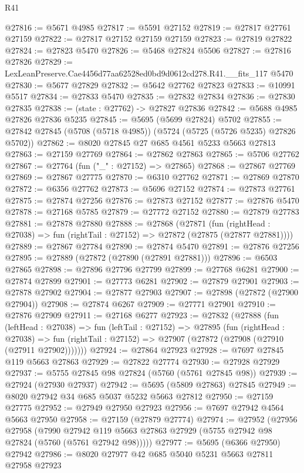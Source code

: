 \begin{lexlean}{R41}
\begin{coremodule}
@27816 := @5671 @4985
@27817 := @5591 @27152
@27819 := @27817 @27761 @27159
@27822 := @27817 @27152 @27159 @27159
@27823 := @27819 @27822
@27824 := @27823 @5470
@27826 := @5468 @27824 @5506
@27827 := @27816 @27826
@27829 := LexLeanPreserve.Cae4456d77aa62528ed0bd9d0612cd278.R41.__fits_117 @5470
@27830 := @5677 @27829
@27832 := @5642 @27762 @27823
@27833 := @10991 @5517
@27834 := @27833 @5470
@27835 := @27832 @27834
@27836 := @27830 @27835
@27838 := (state : @27762) -> @27827 @27836
@27842 := @5688 @4985 @27826 @27836 @5235
@27845 := @5695 (@5699 @27824) @5702
@27855 := @27842 @27845 (@5708 (@5718 @4985)) (@5724 (@5725 (@5726 @5235) @27826 @5702))
@27862 := @8020 @27845 @27 @685 @4561 @5233 @5663 @27813
@27863 := @27159 @27769
@27864 := @27862 @27863
@27865 := @5706 @27762
@27867 := @27764 (fun ("_" : @27152) => @27865)
@27868 := @27867 @27769
@27869 := @27867 @27775
@27870 := @6310 @27762
@27871 := @27869 @27870
@27872 := @6356 @27762
@27873 := @5696 @27152
@27874 := @27873 @27761
@27875 := @27874 @27256
@27876 := @27873 @27152
@27877 := @27876 @5470
@27878 := @27168 @5785
@27879 := @27772 @27152
@27880 := @27879 @27783
@27881 := @27878 @27880
@27888 := @27868
    (@27871
      (fun (rightHead : @27038) => fun (rightTail : @27152) => @27872 (@27875 (@27877 @27881))))
@27889 := @27867 @27784
@27890 := @27874 @5470
@27891 := @27876 @27256
@27895 := @27889 (@27872 (@27890 (@27891 @27881)))
@27896 := @6503 @27865
@27898 := @27896 @27796 @27799
@27899 := @27768 @6281
@27900 := @27874 @27899
@27901 := @27773 @6281
@27902 := @27879 @27901
@27903 := @27878 @27902
@27904 := @27877 @27903
@27907 := @27898 (@27872 (@27900 @27904))
@27908 := @27874 @6267
@27909 := @27771 @27901
@27910 := @27876 @27909
@27911 := @27168 @6277
@27923 := @27832
    (@27888
      (fun (leftHead : @27038) =>
      fun (leftTail : @27152) =>
      @27895
        (fun (rightHead : @27038) =>
        fun (rightTail : @27152) => @27907 (@27872 (@27908 (@27910 (@27911 @27902)))))))
@27924 := @27864 @27923
@27928 := @7697 @27845 @119 @5663 @27863
@27929 := @27822 @27774
@27930 := @27928 @27929
@27937 := @5755 @27845 @98 @27824 (@5760 (@5761 @27845 @98))
@27939 := @27924 (@27930 @27937)
@27942 := @5695 (@5809 @27863) @27845
@27949 := @8020 @27942 @34 @685 @5037 @5232 @5663 @27812
@27950 := @27159 @27775
@27952 := @27949 @27950 @27923
@27956 := @7697 @27942 @4564 @5663 @27950
@27958 := @27159 (@27879 @27774)
@27974 := @27952
    (@27956
      @27958
      (@7990 @27942 @119 @5663 @27863 @27929 (@5755 @27942 @98 @27824 (@5760 (@5761 @27942 @98)))))
@27977 := @5695 (@6366 @27950) @27942
@27986 := @8020 @27977 @42 @685 @5040 @5231 @5663 @27811 @27958 @27923

\end{coremodule}
\end{lexlean}
